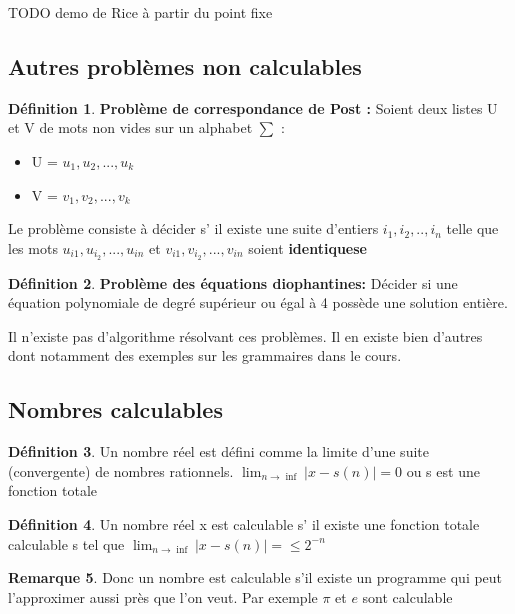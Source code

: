 \documentclass[11pt,a4paper]{article}
\theoremstyle{definition}
\newtheorem{mydef}{Définition}
\newtheorem{myrem}[mydef]{Remarque}
\begin{document}
TODO demo de Rice à partir du point fixe

\subsection{Autres problèmes non calculables}
\label{sub:autres_probl_mes_non_calculable}

\begin{mydef}
	\textbf{Problème de correspondance de Post :} Soient deux listes U et V 
	de mots non vides sur un alphabet $\sum$ : 
	\begin{itemize}
		\item U = ${u_1,u_2,...,u_k}$
		\item V = ${v_1,v_2,...,v_k}$
	\end{itemize}
	Le problème consiste à décider s’ il existe une suite d'entiers 
	$i_1,i_2,..,i_n$ telle que les mots $u_{i1},u_{i_2},...,u_{in}$ et 
	$v_{i1},v_{i_2},...,v_{in}$ soient \textbf{identiquese}
\end{mydef}

\begin{mydef}
	\textbf{Problème des équations diophantines:} Décider si une équation 
	polynomiale de degré supérieur ou égal à 4 possède une solution entière.
\end{mydef}

Il n'existe pas d'algorithme résolvant ces problèmes. Il en existe bien d'autres 
dont notamment des exemples sur les grammaires dans le cours.

\subsection{Nombres calculables}
\label{sub:nombres_calculables}

\begin{mydef}
	Un nombre réel est défini comme la limite d'une suite (convergente) de 
	nombres rationnels. $\lim_{n \rightarrow \inf} |x-s(n)| = 0 $ ou s est 
	une fonction totale
\end{mydef}

\begin{mydef}
	Un nombre réel x est calculable s’ il existe une fonction totale 
	calculable s tel que $\lim_{n \rightarrow \inf} |x-s(n)| =\leq 2^{-n}$
\end{mydef}

\begin{myrem}
	Donc un nombre est calculable s'il existe un programme qui peut 
	l'approximer aussi près que l'on veut. Par exemple $\pi$ et $e$ sont 
	calculable
\end{myrem}
\end{document}
